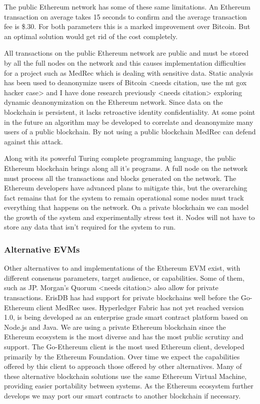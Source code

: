 \documentclass[a4paper]{article}
\begin{document}
The public Ethereum network has some of these same limitations. An Ethereum transaction on average takes 15 seconds to confirm and the average transaction fee is \$.30. For both parameters this is a marked improvement over Bitcoin. But an optimal solution would get rid of the cost completely.

All transactions on the public Ethereum network are public and must be stored by all the full nodes on the network and this causes implementation difficulties for a project such as MedRec which is dealing with sensitive data. Static analysis has been used to deanonymize users of Bitcoin <needs citation, use the mt gox hacker case>  and I have done research previously <needs citation> exploring dynamic deanonymization on the Ethereum network. Since data on the blockchain is persistent, it lacks retroactive identity confidentiality. At some point in the future an algorithm may be developed to correlate and deanonymize many users of a public blockchain. By not using a public blockchain MedRec can defend against this attack.

Along with its powerful Turing complete programming language, the public Ethereum blockchain brings along all it's programs. A full node on the network must process all the transactions and blocks generated on the network. The Ethereum developers have advanced plans to mitigate this, but the overarching fact remains that for the system to remain operational some nodes must track everything that happens on the network. On a private blockchain we can model the growth of the system and experimentally stress test it. Nodes will not have to store any data that isn't required for the system to run.

\subsubsection{Alternative EVMs}

Other alternatives to and implementations of the Ethereum EVM exist, with different consensus parameters, target audience, or capabilities. Some of them, such as JP. Morgan's Quorum <needs citation> also allow for private transactions. ErisDB has had support for private blockchains well before the Go-Ethereum client MedRec uses. Hyperledger Fabric has not yet reached version 1.0, is being developed as an enterprise grade smart contract platform based on Node.js and Java. We are using a private Ethereum blockchain since the Ethereum ecosystem is the most diverse and has the most public scrutiny and support. The Go-Ethereum client is the most used Ethereum client, developed primarily by the Ethereum Foundation. Over time we expect the capabilities offered by this client to approach those offered by other alternatives. Many of these alternative blockchain solutions use the same Ethereum Virtual Machine, providing easier portability between systems. As the Ethereum ecosystem further develops we may port our smart contracts to another blockchain if necessary.
\end{document}
